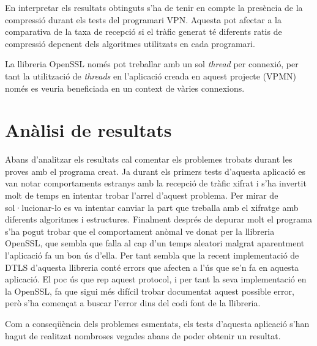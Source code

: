 En interpretar els resultats obtinguts s'ha de tenir en compte la presència de la compressió durant els tests del programari VPN. Aquesta pot afectar a la comparativa de la taxa de recepció si el tràfic generat té diferents ratis de compressió depenent dels algoritmes utilitzats en cada programari.

La llibreria OpenSSL només pot treballar amb un sol \emph{thread} per connexió, per tant la utilització de \emph{threads} en l'aplicació creada en aquest projecte (VPMN) només es veuria beneficiada en un context de vàries connexions.


\section{Anàlisi de resultats}
Abans d'analitzar els resultats cal comentar els problemes trobats durant les proves amb el programa creat. 
Ja durant els primers tests d'aquesta aplicació es van notar comportaments estranys amb la recepció de tràfic xifrat i s'ha invertit molt de temps en intentar trobar l'arrel d'aquest problema. Per mirar de sol·lucionar-lo es va intentar canviar la part que treballa amb el xifratge amb diferents algoritmes i estructures. Finalment després de depurar molt el programa s'ha pogut trobar que el comportament anòmal ve donat per la llibreria OpenSSL, que sembla que falla al cap d'un temps aleatori malgrat aparentment l'aplicació fa un bon ús d'ella. Per tant sembla que la recent implementació de DTLS d'aquesta llibreria conté errors que afecten a l'ús que se'n fa en aquesta aplicació.
El poc ús que rep aquest protocol, i per tant la seva implementació en la OpenSSL, fa que sigui més difícil trobar documentat aquest possible error, però s'ha començat a buscar l'error dins del codi font de la llibreria.

Com a conseqüència dels problemes esmentats, els tests d'aquesta aplicació s'han hagut de realitzat nombroses vegades abans de poder obtenir un resultat.

